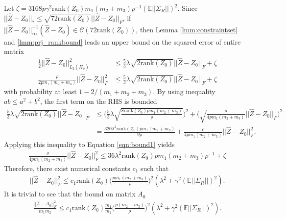 \documentclass{article} %
\newcommand\mc{\mathcal} %
\begin{document}
Let $\zeta = 3168p\gamma^2\text{rank}(Z_0)m_1(m_2+m_3)\rho^{-1}(\mathbb{E}||\Sigma_R||)^2$. Since $||\hat{Z} - Z_0||_* \leq \sqrt{72\text{rank}(Z_0)}||\hat{Z} - Z_0||_F$, if $||\hat{Z}-Z_0||_\infty^{-1}(\hat{Z}-Z_0) \in \mc{C}(72\text{rank}(Z_0))$, then Lemma \ref{lmm:constraintset} and \ref{lmm:prj_rankbound} leads an upper bound on the squared error of entire matrix
\begin{align}
\frac{1}{2}||\hat{Z}-Z_0||_{L_2(\Pi_\rho)}^2 &\leq \frac{5}{3}\lambda\sqrt{2\text{rank}(Z_0)}||\hat{Z} - Z_0||_F + \zeta \\
\frac{\rho}{2pm_1(m_2+m_3)} ||\hat{Z} - Z_0||_F^2 &\leq \frac{5}{3}\lambda\sqrt{2\text{rank}(Z_0)}||\hat{Z} - Z_0||_F + \zeta \label{eqn:bound1}
\end{align}
with probability at least $1-2/(m_1+m_2+m_3)$. By using inequality $ab \leq a^2 + b^2$, the first term on the RHS is bounded
\begin{align}
\frac{5}{3}\lambda\sqrt{2\text{rank}(Z_0)}||\hat{Z} - Z_0||_F & \leq \bigg(\frac{5}{3}\lambda\sqrt{\frac{8\text{rank}(Z_0)pm_1(m_2+m_3)}{\rho}}\bigg)^2 
+ \bigg(\sqrt{\frac{\rho}{4pm_1(m_2+m_3)}}||\hat{Z} - Z_0||_F\bigg)^2 \\
& = \frac{320\lambda^2 \text{rank}(Z_0)pm_1(m_2+m_3)}{9\rho} + \frac{\rho}{4pm_1(m_2+m_3)}||\hat{Z}-Z_0||_F^2.
\end{align}
Applying this inequality to Equation \ref{eqn:bound1} yields
\begin{align}
\frac{\rho}{4pm_1(m_2+m_3)} ||\hat{Z} - Z_0||_F^2 \leq  36\lambda^2 \text{rank}(Z_0)pm_1(m_2+m_3)\rho^{-1} + \zeta
\end{align}
Therefore, there exist numerical constants $c_1$ such that
\begin{align}
||\hat{Z} - Z_0||_F^2 \leq  c_1 \text{rank}(Z_0)\bigg(\frac{pm_1(m_2+m_3)}{\rho}\bigg)^2(\lambda^2 + \gamma^2(\mathbb{E}||\Sigma_R||)^2).
\end{align}
It is trivial to see that the bound on matrix $A_0$
\begin{align}
\frac{||\hat{A}-A_0||_F^2}{m_1m_2} \leq  c_1 \text{rank}(Z_0)\frac{m_1}{m_2}\bigg(\frac{p(m_2+m_3)}{\rho}\bigg)^2(\lambda^2 + \gamma^2(\mathbb{E}||\Sigma_R||)^2).
\end{align}
\end{document}
